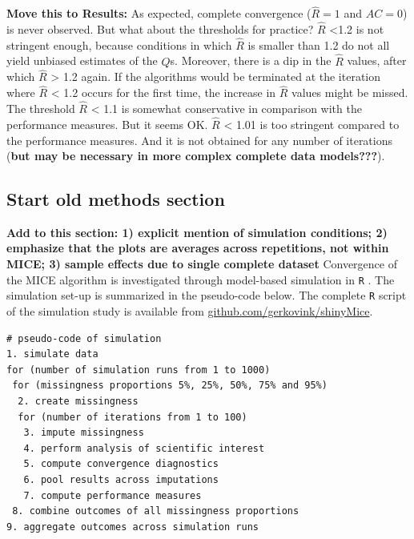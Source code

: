 \documentclass[Royal,times,sageh]{sagej}
\begin{document}
\textbf{Move this to Results:} As expected, complete convergence
(\(\widehat{R}=1\) and \(AC=0\)) is never observed. But what about the
thresholds for practice? \(\widehat{R}\) \textless1.2 is not stringent
enough, because conditions in which \(\widehat{R}\) is smaller than 1.2
do not all yield unbiased estimates of the \(Q\)s. Moreover, there is a
dip in the \(\widehat{R}\) values, after which \(\widehat{R}\)
\textgreater{} 1.2 again. If the algorithms would be terminated at the
iteration where \(\widehat{R}\) \textless{} 1.2 occurs for the first
time, the increase in \(\widehat{R}\) values might be missed. The
threshold \(\widehat{R}\) \textless{} 1.1 is somewhat conservative in
comparison with the performance measures. But it seems OK.
\(\widehat{R}\) \textless{} 1.01 is too stringent compared to the
performance measures. And it is not obtained for any number of
iterations (\textbf{but may be necessary in more complex complete data
models???}).

\hypertarget{start-old-methods-section}{%
\subsection{Start old methods section}\label{start-old-methods-section}}

\textbf{Add to this section: 1) explicit mention of simulation
conditions; 2) emphasize that the plots are averages across repetitions,
not within MICE; 3) sample effects due to single complete dataset}
Convergence of the MICE algorithm is investigated through model-based
simulation in \texttt{R} \citep[version 3.6.3;][]{R}. The simulation
set-up is summarized in the pseudo-code below. The complete \texttt{R}
script of the simulation study is available from
\href{https://github.com/gerkovink/shinyMice/tree/master/3.Thesis/1.SimulationStudy}{github.com/gerkovink/shinyMice}.

\begin{verbatim}
# pseudo-code of simulation 
1. simulate data 
for (number of simulation runs from 1 to 1000)
 for (missingness proportions 5%, 25%, 50%, 75% and 95%)
  2. create missingness
  for (number of iterations from 1 to 100)
   3. impute missingness
   4. perform analysis of scientific interest
   5. compute convergence diagnostics 
   6. pool results across imputations
   7. compute performance measures
 8. combine outcomes of all missingness proportions
9. aggregate outcomes across simulation runs 
\end{verbatim}
\end{document}
